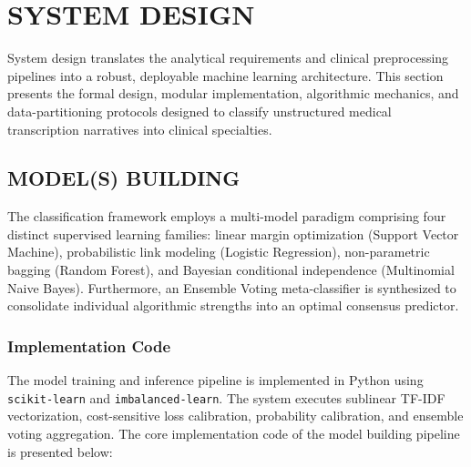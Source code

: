 \clearpage

\section{SYSTEM DESIGN}

System design translates the analytical requirements and clinical preprocessing pipelines into a robust, deployable machine learning architecture. This section presents the formal design, modular implementation, algorithmic mechanics, and data-partitioning protocols designed to classify unstructured medical transcription narratives into clinical specialties.

\subsection{MODEL(S) BUILDING}

The classification framework employs a multi-model paradigm comprising four distinct supervised learning families: linear margin optimization (Support Vector Machine), probabilistic link modeling (Logistic Regression), non-parametric bagging (Random Forest), and Bayesian conditional independence (Multinomial Naive Bayes). Furthermore, an Ensemble Voting meta-classifier is synthesized to consolidate individual algorithmic strengths into an optimal consensus predictor.

\subsubsection{Implementation Code}

The model training and inference pipeline is implemented in Python using \texttt{scikit-learn} and \texttt{imbalanced-learn}. The system executes sublinear TF-IDF vectorization, cost-sensitive loss calibration, probability calibration, and ensemble voting aggregation. The core implementation code of the model building pipeline is presented below:

